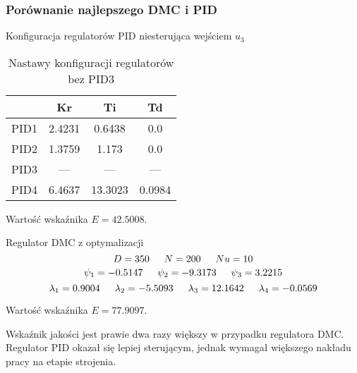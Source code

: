 \subsubsection{Porównanie najlepszego DMC i PID}

Konfiguracja regulatorów PID niesterująca wejściem $u_{3}$

\begin{table}[H]
    \centering
    \begin{tabular}{|l|c|c|c|}
    \hline
         & Kr  & Ti  & Td  \\ \hline
    PID1 & 2.4231 & 0.6438 & 0.0 \\ \hline
    PID2 & 1.3759 & 1.173 & 0.0 \\ \hline
    PID3 & --- & --- & --- \\ \hline
    PID4 & 6.4637 & 13.3023 & 0.0984 \\ \hline
    \end{tabular}
    \caption[H]{Nastawy konfiguracji regulatorów bez PID3}
\end{table}

Wartość wskaźnika $E=\num{42.5008}$.
\newline

Regulator DMC z optymalizacji
$$D=350 \indent  N=200 \indent  Nu=10$$ 
$$\psi_1=\num{-0.5147} \indent \psi_2=\num{-9.3173} \indent \psi_3=\num{3.2215 }$$
$$\lambda_1=\num{0.9004} \indent \lambda_2=\num{-5.5093} \indent \lambda_3=\num{12.1642} \indent \lambda_4=\num{-0.0569}$$

Wartość wskaźnika $E=\num{77.9097}$.
\newline

Wskaźnik jakości jest prawie dwa razy większy w przypadku regulatora DMC.
Regulator PID okazał się lepiej sterującym, jednak wymagał większego nakładu pracy na etapie strojenia.


\newpage

